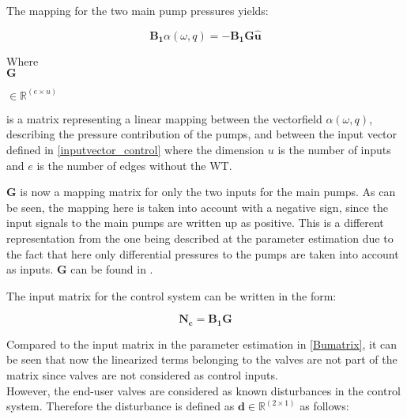 The mapping for the two main pump pressures yields:

\begin{equation}
\bm{B_1} \alpha(\omega,q) = -\bm{B_1} \bm{G} \bm{\hat{u}}
\label{mapping_main}
\end{equation}

\begin{minipage}[t]{0.12\textwidth}
Where\\
\hspace*{8mm} $\bm{G}$ 
\end{minipage}
\begin{minipage}[t]{0.12\textwidth}
\vspace*{2mm}$\in \pmb{\mathbb{R}}^{(e \times u)} $ 
\end{minipage}
\begin{minipage}[t]{0.74\textwidth}
\vspace*{2mm}
is a matrix representing a linear mapping between the vectorfield $\alpha(\omega,q)$, describing the pressure contribution of the pumps, and between the input vector defined in \eqref{inputvector_control} where the dimension $u$ is the number of inputs and $e$ is the number of edges without the WT. 
\end{minipage} 

$\bm{G}$ is now a mapping matrix for only the two inputs for the main pumps. As can be seen, the mapping here is taken into account with a negative sign, since the input signals to the main pumps are written up as positive. This is a different representation from the one being described at the parameter estimation due to the fact that here only differential pressures to the pumps are taken into account as inputs. $\bm{G}$ can be found in .

The input matrix for the control system can be written in the form: 

\begin{equation}
  \bm{N_c} =  \bm{B_1}\bm{G}  
\label{inputmatrix_control}	
\end{equation}

Compared to the input matrix in the parameter estimation in \eqref{Bumatrix}, it can be seen that now the linearized terms belonging to the valves are not part of the matrix since valves are not considered as control inputs. 
\\
However, the end-user valves are considered as known disturbances in the control system. Therefore the disturbance is defined as $\bm{d} \in \pmb{\mathbb{R}}^{(2 \times 1)}$ as follows: 

